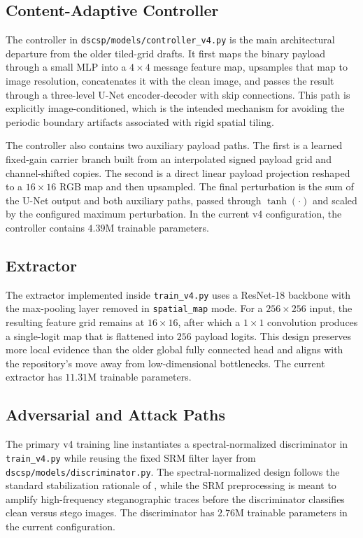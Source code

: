 \documentclass[journal]{IEEEtran}
\begin{document}
\subsection{Content-Adaptive Controller}
The controller in \texttt{dscsp/models/controller\_v4.py} is the main architectural departure from the older tiled-grid drafts. It first maps the binary payload through a small MLP into a $4\times4$ message feature map, upsamples that map to image resolution, concatenates it with the clean image, and passes the result through a three-level U-Net encoder-decoder with skip connections. This path is explicitly image-conditioned, which is the intended mechanism for avoiding the periodic boundary artifacts associated with rigid spatial tiling.

The controller also contains two auxiliary payload paths. The first is a learned fixed-gain carrier branch built from an interpolated signed payload grid and channel-shifted copies. The second is a direct linear payload projection reshaped to a $16\times16$ RGB map and then upsampled. The final perturbation is the sum of the U-Net output and both auxiliary paths, passed through $\tanh(\cdot)$ and scaled by the configured maximum perturbation. In the current v4 configuration, the controller contains $4.39$M trainable parameters.

\subsection{Extractor}
The extractor implemented inside \texttt{train\_v4.py} uses a ResNet-18 backbone \cite{he2016deep} with the max-pooling layer removed in \texttt{spatial\_map} mode. For a $256\times256$ input, the resulting feature grid remains at $16\times16$, after which a $1\times1$ convolution produces a single-logit map that is flattened into $256$ payload logits. This design preserves more local evidence than the older global fully connected head and aligns with the repository's move away from low-dimensional bottlenecks. The current extractor has $11.31$M trainable parameters.

\subsection{Adversarial and Attack Paths}
The primary v4 training line instantiates a spectral-normalized discriminator in \texttt{train\_v4.py} while reusing the fixed SRM filter layer from \texttt{dscsp/models/discriminator.py}. The spectral-normalized design follows the standard stabilization rationale of \cite{miyato2018spectral}, while the SRM preprocessing is meant to amplify high-frequency steganographic traces before the discriminator classifies clean versus stego images. The discriminator has $2.76$M trainable parameters in the current configuration.
\end{document}
